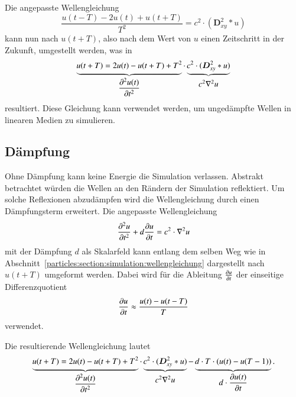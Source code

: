 Die angepasste Wellengleichung 
\[
    \frac{u(t-T) - 2 u(t) + u(t+T)}{T^2} = c^2 \cdot (\boldsymbol{D}^2_{xy} * u)
\]
kann nun nach $u(t+T)$, also nach dem Wert von $u$ einen Zeitschritt in der Zukunft, umgestellt werden, was in
\[
    \underbrace{%
        u(t+T) = 2 u(t) - u(t+T) + T^2      %
        \vphantom{\boldsymbol{D}^2_{xy}}        %
    }_{%
        \displaystyle
        \frac{\d^2 u(t)}{\d t^2}            %
    } 
    \cdot 
    \underbrace{%
        c^2 \cdot (\boldsymbol{D}^2_{xy} * u)   %
    }_{%
        \textstyle
        c^2 \nabla^2 u                      %
        \vphantom{\frac{\d^2 u(t)}{\d t^2}} %
    }
\]
resultiert.
Diese Gleichung kann verwendet werden, um ungedämpfte Wellen in linearen Medien zu simulieren.

\subsection{Dämpfung}
%
Ohne Dämpfung kann keine Energie die Simulation verlassen. 
Abstrakt betrachtet würden die Wellen an den Rändern der Simulation reflektiert. 
Um solche Reflexionen abzudämpfen wird die Wellengleichung durch einen Dämpfungsterm erweitert.
Die angepasste Wellengleichung 
\[
    \frac{\d^2 u}{\d t^2} + d \frac{\d u}{\d t}= c^2 \cdot \nabla^2 u
\]
mit der Dämpfung $d$ als Skalarfeld kann entlang dem selben Weg wie in Abschnitt~\ref{particles:section:simulation:wellengleichung} dargestellt nach $u(t+T)$ umgeformt werden.
Dabei wird für die Ableitung $\frac{\d u}{\d t}$ der einseitige Differenzquotient
\[
    \frac{\d u}{\d t} \approx \frac{u(t) - u(t-T)}{T}
\]
verwendet.

Die resultierende Wellengleichung lautet
\[
    \underbrace{%
        u(t+T) = 2 u(t) - u(t+T) + T^2      %
        \vphantom{\boldsymbol{D}^2_{xy}}        %
    }_{%
        \displaystyle
        \frac{\d^2 u(t)}{\d t^2}            %
    } 
    \cdot 
    \underbrace{%
        c^2 \cdot (\boldsymbol{D}^2_{xy} * u)   %
    }_{%
        \textstyle
        c^2 \nabla^2 u                      %
        \vphantom{\frac{\d^2 u(t)}{\d t^2}} %
    }
     - 
    \underbrace{%
        d \cdot T \cdot (u(t) - u(T-1))
        \vphantom{\boldsymbol{D}^2_{xy}}        %
    }_{%
        \displaystyle
        d \cdot \frac{\d u(t)}{\d t}        %
    }.
\]

